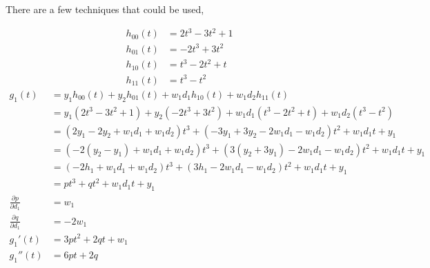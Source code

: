 \documentclass{article}
\begin{document}
There are a few techniques that could be used,

\newcommand{\dx}{\, \mathrm{d}x}
\newcommand{\dt}{\, \mathrm{d}t}
\newcommand{\dv}{\, \mathrm{d}v}
\newcommand{\du}{\, \mathrm{d}u}
\newcommand{\ddx}[1]{\frac{\mathrm{d}#1}{\mathrm{d}x}}
\newcommand{\dd}[2]{\frac{\mathrm{d}#1}{\mathrm{d}#2}}

\newpage
\begin{align*}
  h_{00}(t)
  &= 2t^3-3t^2+1 \\
  h_{01}(t)
  &= -2t^3+3t^2 \\
  h_{10}(t)
  &= t^3-2t^2+t \\
  h_{11}(t)
  &= t^3-t^2
\end{align*}
\begin{align*}
  g_1(t)
  &= y_1h_{00}(t)+y_2h_{01}(t)+w_1d_1h_{10}(t)+w_1d_2h_{11}(t) \\
  &= y_1(2t^3-3t^2+1)+y_2(-2t^3+3t^2)+w_1d_1(t^3-2t^2+t)+w_1d_2(t^3-t^2) \\
  &= (2y_1-2y_2+w_1d_1+w_1d_2)t^3+(-3y_1+3y_2-2w_1d_1-w_1d_2)t^2+w_1d_1t+y_1 \\
  &= (-2(y_2-y_1)+w_1d_1+w_1d_2)t^3+(3(y_2+3y_1)-2w_1d_1-w_1d_2)t^2+w_1d_1t+y_1 \\
  &= (-2h_1+w_1d_1+w_1d_2)t^3+(3h_1-2w_1d_1-w_1d_2)t^2+w_1d_1t+y_1 \\
  &= pt^3+qt^2+w_1d_1t+y_1 \\
  \frac{\partial p}{\partial d_1}
  &= w_1 \\
  \frac{\partial q}{\partial d_1}
  &= -2w_1 \\
  g_1'(t)
  &= 3pt^2+2qt+w_1 \\
  g_1''(t)
  &= 6pt+2q
\end{align*}
\end{document}
